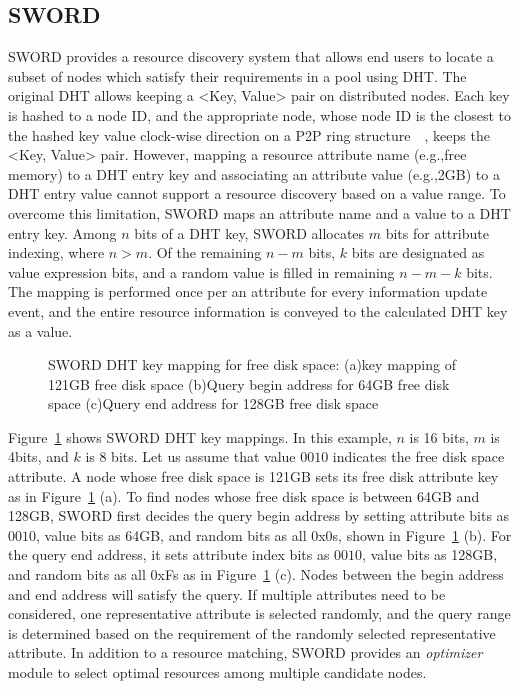 \documentclass{acm_proc_article-sp}
\begin{document}
\subsection{SWORD}
SWORD provides a resource discovery system that allows end users to locate a subset of nodes which satisfy their requirements in a pool using DHT.
The original DHT allows keeping a <Key, Value> pair on distributed nodes. 
Each key is hashed to a node ID, and the appropriate node, whose node ID is the closest to the hashed key value clock-wise direction on a P2P ring structure~\cite{chord}~\cite{pastry}, keeps the <Key, Value> pair. 
However, mapping a resource attribute name (e.g.,free memory) to a DHT entry key and associating an attribute value (e.g.,2GB) to a DHT entry value cannot support a resource discovery based on a value range. 
To overcome this limitation, SWORD maps an attribute name and a value to a DHT entry key. Among $n$ bits of a DHT key, SWORD allocates $m$ bits for attribute indexing, where $n>m$. 
Of the remaining $n-m$ bits, $k$ bits are designated as value expression bits, and a random value is filled in remaining $n-m-k$ bits.
The mapping is performed once per an attribute for every information update event, and the entire resource information is conveyed to the calculated DHT key as a value.
\begin{figure}
\centering
{}
\caption{\label{fig:sword}SWORD DHT key mapping for free disk space: (a)key mapping of 121GB free disk space (b)Query begin address for 64GB free disk space (c)Query end address for 128GB free disk space}
\end{figure}
Figure~\ref{fig:sword} shows SWORD DHT key mappings. In this example, $n$ is 16 bits, $m$ is 4bits, and $k$ is 8 bits. Let us assume that value $0010$ indicates the free disk space attribute.
A node whose free disk space is 121GB sets its free disk attribute key as in Figure~\ref{fig:sword} (a).
To find nodes whose free disk space is between 64GB and 128GB, SWORD first decides the query begin address by setting attribute bits as $0010$, value bits as 64GB, and random bits as all 0x0s, shown in Figure~\ref{fig:sword} (b).
For the query end address, it sets attribute index bits as $0010$, value bits as 128GB, and random bits as all 0xFs as in Figure~\ref{fig:sword} (c).
Nodes between the begin address and end address will satisfy the query. 
If multiple attributes need to be considered, one representative attribute is selected randomly, and the query range is determined based on the requirement of the randomly selected representative attribute.
In addition to a resource matching, SWORD provides an \textit{optimizer} module to select optimal resources among multiple candidate nodes. 
\end{document}
